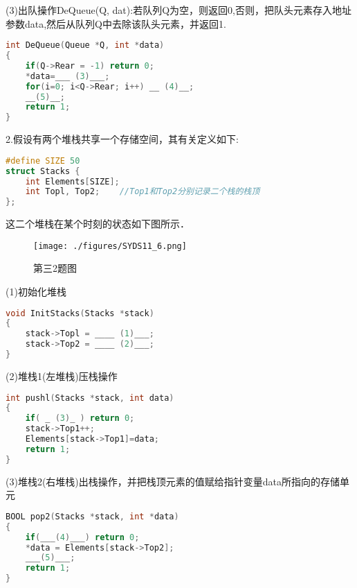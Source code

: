 (3)出队操作DeQueue(Q, dat):若队列Q为空，则返回0,否则，把队头元素存入地址参数data,然后从队列Q中去除该队头元素，并返回1.
\begin{lstlisting}[language=cpp]
int DeQueue(Queue *Q, int *data)
{
    if(Q->Rear = -1) return 0;
    *data=___ (3)___;
    for(i=0; i<Q->Rear; i++) __ (4)__;
    __(5)__;
    return 1;
}
\end{lstlisting}

2.假设有两个堆栈共享一个存储空间，其有关定义如下:
\begin{lstlisting}[language=cpp]
#define SIZE 50
struct Stacks {
    int Elements[SIZE];
    int Topl, Top2;    //Top1和Top2分别记录二个栈的栈顶
};
\end{lstlisting}
这二个堆栈在某个时刻的状态如下图所示．
\begin{figure}[ht]
\centering
\texttt{[image: ./figures/SYDS11\_6.png]}
\caption{第三2题图} \label{SYDS11_fig6}
\end{figure}
(1)初始化堆栈
\begin{lstlisting}[language=cpp]
void InitStacks(Stacks *stack)
{
    stack->Topl = ____ (1)___;
    stack->Top2 = ____ (2)___;
}
\end{lstlisting}
(2)堆栈1(左堆栈)压栈操作
\begin{lstlisting}[language=cpp]
int pushl(Stacks *stack, int data)
{
    if( _ (3)_ ) return 0;
    stack->Top1++;
    Elements[stack->Top1]=data;
    return 1;
}
\end{lstlisting}
(3)堆栈2(右堆栈)出栈操作，并把栈顶元素的值赋给指针变量data所指向的存储单元
\begin{lstlisting}[language=cpp]
BOOL pop2(Stacks *stack, int *data)
{
    if(___(4)___) return 0;
    *data = Elements[stack->Top2];
    ___(5)___;
    return 1;
}
\end{lstlisting}